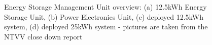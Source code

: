 \begin{figure}\centering
	\\
	\\
	\caption{Energy Storage Management Unit overview: (a) 12.5kWh Energy Storage Unit, (b) Power Electronics Unit, (c) deployed 12.5kWh system, (d) deployed 25kWh system - pictures are taken from the NTVV close down report \cite{NTVV9.8a}}
	\label{ch-literature:fig:esmu}
\end{figure}